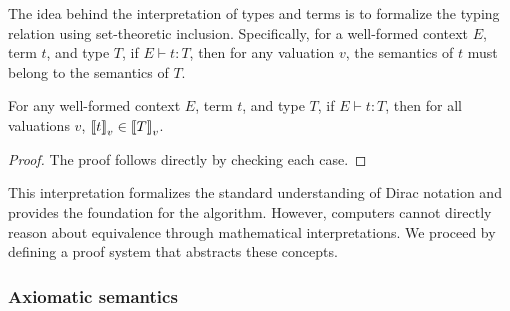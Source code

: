 
The idea behind the interpretation of types and terms is to formalize the typing relation using set-theoretic inclusion. Specifically, for a well-formed context \( E \), term \( t \), and type \( T \), if \( E \vdash t : T \), then for any valuation \( v \), the semantics of \( t \) must belong to the semantics of \( T \).

\begin{lemma}
    For any well-formed context \( E \), term \( t \), and type \( T \), if \( E \vdash t : T \), then for all valuations \( v \), \( {\llbracket t \rrbracket}_v \in {\llbracket T \rrbracket}_v \).
\end{lemma}

\begin{proof}
    The proof follows directly by checking each case.
\end{proof}

This interpretation formalizes the standard understanding of Dirac notation and provides the foundation for the algorithm. However, computers cannot directly reason about equivalence through mathematical interpretations. We proceed by defining a proof system that abstracts these concepts.



\subsubsection{Axiomatic semantics} 

